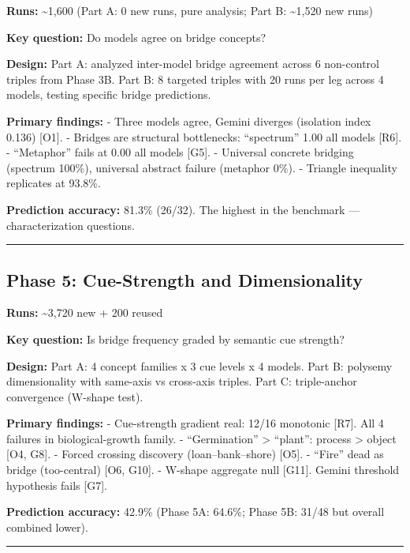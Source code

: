 \textbf{Runs:} \textasciitilde1,600 (Part A: 0 new runs, pure analysis; Part B: \textasciitilde1,520 new runs)

\textbf{Key question:} Do models agree on bridge concepts?

\textbf{Design:} Part A: analyzed inter-model bridge agreement across 6 non-control triples from Phase 3B. Part B: 8 targeted triples with 20 runs per leg across 4 models, testing specific bridge predictions.

\textbf{Primary findings:} - Three models agree, Gemini diverges (isolation index 0.136) {[}O1{]}. - Bridges are structural bottlenecks: ``spectrum'' 1.00 all models {[}R6{]}. - ``Metaphor'' fails at 0.00 all models {[}G5{]}. - Universal concrete bridging (spectrum 100\%), universal abstract failure (metaphor 0\%). - Triangle inequality replicates at 93.8\%.

\textbf{Prediction accuracy:} 81.3\% (26/32). The highest in the benchmark --- characterization questions.

\begin{center}\rule{0.5\linewidth}{0.5pt}\end{center}

\subsection{Phase 5: Cue-Strength and Dimensionality}\label{phase-5-cue-strength-and-dimensionality}

\textbf{Runs:} \textasciitilde3,720 new + 200 reused

\textbf{Key question:} Is bridge frequency graded by semantic cue strength?

\textbf{Design:} Part A: 4 concept families x 3 cue levels x 4 models. Part B: polysemy dimensionality with same-axis vs cross-axis triples. Part C: triple-anchor convergence (W-shape test).

\textbf{Primary findings:} - Cue-strength gradient real: 12/16 monotonic {[}R7{]}. All 4 failures in biological-growth family. - ``Germination'' \textgreater{} ``plant'': process \textgreater{} object {[}O4, G8{]}. - Forced crossing discovery (loan--bank--shore) {[}O5{]}. - ``Fire'' dead as bridge (too-central) {[}O6, G10{]}. - W-shape aggregate null {[}G11{]}. Gemini threshold hypothesis fails {[}G7{]}.

\textbf{Prediction accuracy:} 42.9\% (Phase 5A: 64.6\%; Phase 5B: 31/48 but overall combined lower).

\begin{center}\rule{0.5\linewidth}{0.5pt}\end{center}

